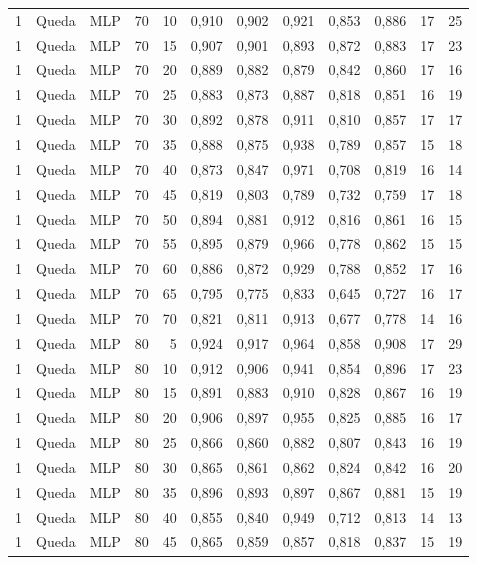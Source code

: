 \begin{longtable}{@{}rllrrrrrrrrr@{}}
1 & Queda & MLP & 70 & 10 & 0,910 & 0,902 & 0,921 & 0,853 & 0,886 & 17 & 25 \\
1 & Queda & MLP & 70 & 15 & 0,907 & 0,901 & 0,893 & 0,872 & 0,883 & 17 & 23 \\
1 & Queda & MLP & 70 & 20 & 0,889 & 0,882 & 0,879 & 0,842 & 0,860 & 17 & 16 \\
1 & Queda & MLP & 70 & 25 & 0,883 & 0,873 & 0,887 & 0,818 & 0,851 & 16 & 19 \\
1 & Queda & MLP & 70 & 30 & 0,892 & 0,878 & 0,911 & 0,810 & 0,857 & 17 & 17 \\
1 & Queda & MLP & 70 & 35 & 0,888 & 0,875 & 0,938 & 0,789 & 0,857 & 15 & 18 \\
1 & Queda & MLP & 70 & 40 & 0,873 & 0,847 & 0,971 & 0,708 & 0,819 & 16 & 14 \\
1 & Queda & MLP & 70 & 45 & 0,819 & 0,803 & 0,789 & 0,732 & 0,759 & 17 & 18 \\
1 & Queda & MLP & 70 & 50 & 0,894 & 0,881 & 0,912 & 0,816 & 0,861 & 16 & 15 \\
1 & Queda & MLP & 70 & 55 & 0,895 & 0,879 & 0,966 & 0,778 & 0,862 & 15 & 15 \\
1 & Queda & MLP & 70 & 60 & 0,886 & 0,872 & 0,929 & 0,788 & 0,852 & 17 & 16 \\
1 & Queda & MLP & 70 & 65 & 0,795 & 0,775 & 0,833 & 0,645 & 0,727 & 16 & 17 \\
1 & Queda & MLP & 70 & 70 & 0,821 & 0,811 & 0,913 & 0,677 & 0,778 & 14 & 16 \\
1 & Queda & MLP & 80 & 5 & 0,924 & 0,917 & 0,964 & 0,858 & 0,908 & 17 & 29 \\
1 & Queda & MLP & 80 & 10 & 0,912 & 0,906 & 0,941 & 0,854 & 0,896 & 17 & 23 \\
1 & Queda & MLP & 80 & 15 & 0,891 & 0,883 & 0,910 & 0,828 & 0,867 & 16 & 19 \\
1 & Queda & MLP & 80 & 20 & 0,906 & 0,897 & 0,955 & 0,825 & 0,885 & 16 & 17 \\
1 & Queda & MLP & 80 & 25 & 0,866 & 0,860 & 0,882 & 0,807 & 0,843 & 16 & 19 \\
1 & Queda & MLP & 80 & 30 & 0,865 & 0,861 & 0,862 & 0,824 & 0,842 & 16 & 20 \\
1 & Queda & MLP & 80 & 35 & 0,896 & 0,893 & 0,897 & 0,867 & 0,881 & 15 & 19 \\
1 & Queda & MLP & 80 & 40 & 0,855 & 0,840 & 0,949 & 0,712 & 0,813 & 14 & 13 \\
1 & Queda & MLP & 80 & 45 & 0,865 & 0,859 & 0,857 & 0,818 & 0,837 & 15 & 19 \\

\end{longtable}
